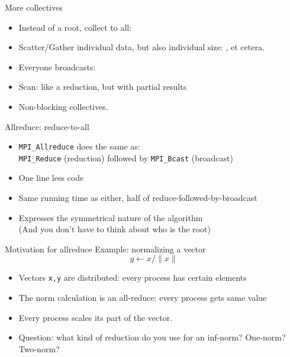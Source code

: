 
\begin{exerciseframe}
  
\end{exerciseframe}

\begin{numberedframe}{More collectives}
  \begin{itemize}
  \item Instead of a root, collect to all: 
  \item Scatter/Gather individual data, but also individual size:
    ,  et cetera.
  \item Everyone broadcasts: 
  \item Scan: like a reduction, but with partial results
  \item Non-blocking collectives.
  \end{itemize}
\end{numberedframe}


\begin{numberedframe}{Allreduce: reduce-to-all}
  \begin{itemize}
  \item \lstinline{MPI_Allreduce} does the same as:\\
    \lstinline{MPI_Reduce} (reduction) followed by \lstinline{MPI_Bcast} (broadcast)
  \item One line less code
  \item Same running time as either, half of reduce-followed-by-broadcast
  \item Expresses the symmetrical nature of the algorithm\\
    (And you don't have to think about who is the root)
  \end{itemize}
\end{numberedframe}

\begin{numberedframe}{Motivation for allreduce}
  Example: normalizing a vector
  \[ y \leftarrow x/\|x\| \]
  \begin{itemize}
  \item Vectors \lstinline{x,y} are distributed: every process has certain
    elements
  \item The norm calculation is an all-reduce: every process gets same
    value
  \item Every process scales its part of the vector.
  \item Question: what kind of reduction do you use for an inf-norm? One-norm? Two-norm?
  \end{itemize}
\end{numberedframe}

